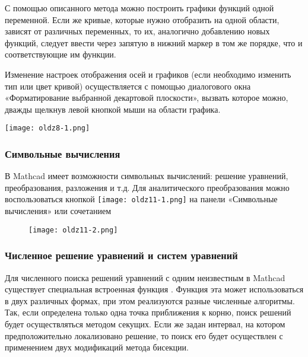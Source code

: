 С помощью описанного метода можно построить графики функций одной переменной. Если же кривые, которые нужно отобразить на одной области, зависят от различных переменных, то их, аналогично добавлению новых функций, следует ввести через запятую в нижний маркер в том же порядке, что и соответствующие им функции.

Изменение настроек отображения осей и графиков (если необходимо изменить тип или цвет кривой) осуществляется с помощью диалогового окна «Форматирование выбранной декартовой плоскости», вызвать которое можно, дважды щелкнув левой кнопкой мыши на области графика.


\begin{center}
	\texttt{[image: oldz8-1.png]}
\end{center}


\subsubsection*{Символьные вычисления}
В Mathcad имеет возможности символьных вычислений: решение уравнений, преобразования, разложения и т.д. Для аналитического преобразования можно воспользоваться кнопкой \texttt{[image: oldz11-1.png]} на панели «Символьные вычисления» или сочетанием 
\begin{figure}[h]
	\begin{center}
		\texttt{[image: oldz11-2.png]}
	\end{center}
\end{figure}

\subsubsection*{Численное решение уравнений и систем уравнений}
Для численного поиска решений уравнений с одним неизвестным в Mathcad существует специальная встроенная функция . Функция эта может использоваться в двух различных формах, при этом реализуются разные численные алгоритмы. Так, если определена только одна точка приближения к корню, поиск решений будет осуществляться методом секущих. Если же задан интервал, на котором предположительно локализовано решение, то поиск его будет осуществлен с применением двух модификаций метода бисекции.


